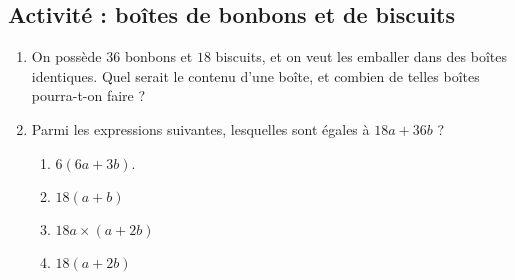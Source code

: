
\subsection*{Activité : boîtes de bonbons et de biscuits}

\begin{enumerate}
    \item   \label{ItemILDXooQXINUca}
        
On possède \( 36\) bonbons et \( 18\) biscuits, et on veut les emballer dans des boîtes identiques. Quel serait le contenu d'une boîte, et combien de telles boîtes pourra-t-on faire ?

\item
    Parmi les expressions suivantes, lesquelles sont égales à \( 18a+36b\) ?
    \begin{enumerate}
        \item
            \( 6(6a+3b)\). 
        \item
            \( 18(a+b)\)
        \item
            \( 18a\times (a+2b)\)
        \item
            \( 18(a+2b)\)
    \end{enumerate}
\end{enumerate}
